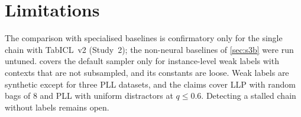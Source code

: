 \section{Limitations}\label{sec:limitations}
The comparison with specialised baselines is confirmatory only for the single chain with TabICL~v2 (Study~2); the
non-neural baselines of \cref{sec:s3b} were run untuned.  covers the default sampler only for
instance-level weak labels with contexts that are not subsampled, and its constants are loose. Weak labels are synthetic
except for three PLL datasets, and the claims cover LLP with random bags of 8 and PLL with uniform distractors at
$q\le0.6$. Detecting a stalled chain without labels remains open.
